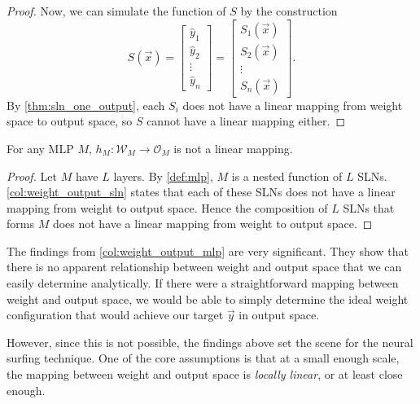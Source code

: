 \begin{proof}
    Now, we can simulate the function of $S$ by the construction
    \begin{equation*}
        S(\vec{x})
        = \begin{bmatrix}
            \hat{y}_1 \\
            \hat{y}_2 \\
            \vdots \\
            \hat{y}_n
        \end{bmatrix}
        = \begin{bmatrix}
            S_1(\vec{x}) \\
            S_2(\vec{x}) \\
            \vdots \\
            S_n(\vec{x})
        \end{bmatrix}.
    \end{equation*}
    By \ref{thm:sln_one_output}, each $S_i$ does not have a linear mapping from weight space to output space, so $S$ cannot have a linear mapping either.
\end{proof}

\begin{corollary}
    \label{col:weight_output_mlp}
    For any MLP $M$, $h_M: \mathcal{W}_M \rightarrow \mathcal{O}_M$ is not a linear mapping.
\end{corollary}
\begin{proof}
    Let $M$ have $L$ layers.
    By \ref{def:mlp}, $M$ is a nested function of $L$ SLNs. 
    \ref{col:weight_output_sln} states that each of these SLNs does not have a linear mapping from weight to output space.
    Hence the composition of $L$ SLNs that forms $M$ does not have a linear mapping from weight to output space.
\end{proof}

\begin{remark}
    The findings from \ref{col:weight_output_mlp} are very significant.
    They show that there is no apparent relationship between weight and output space that we can easily determine analytically. 
    If there were a straightforward mapping between weight and output space, we would be able to simply determine the ideal weight configuration that would achieve our target $\vec{y}$ in output space. 
    
    However, since this is not possible, the findings above set the scene for the neural surfing technique. 
    One of the core assumptions is that at a small enough scale, the mapping between weight and output space is \textit{locally linear}, or at least close enough.
\end{remark}

